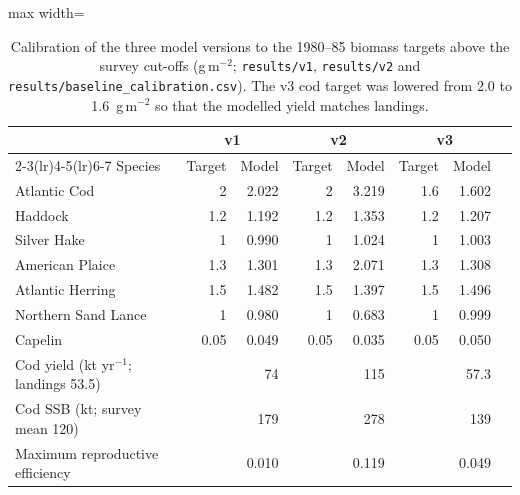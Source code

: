 \documentclass[11pt,letterpaper,fleqn]{article}
\newcommand{\gm}{g\,m$^{-2}$}
\begin{document}
\begin{table}[p]\caption{Calibration of the three model versions to the 1980--85 biomass targets above the survey cut-offs (\gm{}; \nolinkurl{results/v1}, \nolinkurl{results/v2} and \nolinkurl{results/baseline_calibration.csv}). The v3 cod target was lowered from 2.0 to 1.6~\gm{} so that the modelled yield matches landings.}\label{tab:S-versions}
\centering\small\begin{adjustbox}{max width=\textwidth}\begin{tabular}{@{}lrrrrrrr@{}}\toprule
 & \multicolumn{2}{c}{v1} & \multicolumn{2}{c}{v2} & \multicolumn{2}{c}{v3} & \\\cmidrule(lr){2-3}\cmidrule(lr){4-5}\cmidrule(lr){6-7}
Species & Target & Model & Target & Model & Target & Model & \\\midrule
Atlantic Cod & 2 & 2.022 & 2 & 3.219 & 1.6 & 1.602 & \\
Haddock & 1.2 & 1.192 & 1.2 & 1.353 & 1.2 & 1.207 & \\
Silver Hake & 1 & 0.990 & 1 & 1.024 & 1 & 1.003 & \\
American Plaice & 1.3 & 1.301 & 1.3 & 2.071 & 1.3 & 1.308 & \\
Atlantic Herring & 1.5 & 1.482 & 1.5 & 1.397 & 1.5 & 1.496 & \\
Northern Sand Lance & 1 & 0.980 & 1 & 0.683 & 1 & 0.999 & \\
Capelin & 0.05 & 0.049 & 0.05 & 0.035 & 0.05 & 0.050 & \\
\midrule
Cod yield (kt yr$^{-1}$; landings 53.5) & & 74 & & 115 & & 57.3 & \\
Cod SSB (kt; survey mean 120) & & 179 & & 278 & & 139 & \\
Maximum reproductive efficiency & & 0.010 & & 0.119 & & 0.049 & \\
\bottomrule\end{tabular}\end{adjustbox}\end{table}
\end{document}
